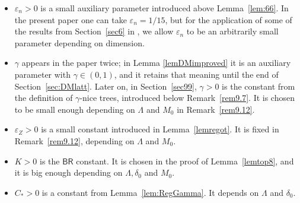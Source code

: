 \documentclass[11pt]{amsart}
\newcommand{\BR}{{\mathsf {BR}}}
\theoremstyle{definition}
\theoremstyle{remark}
\numberwithin{equation}{section}
\begin{document}
\begin{itemize}
	\item $\varepsilon_n>0$ is a small auxiliary parameter introduced above Lemma~\ref{lem:66}. In the present paper one can take $\varepsilon_n=1/15$, but for the application of some of the results from Section~\ref{sec6} in \cite{Tolsa-riesz}, we allow $\varepsilon_n$ to be an arbitrarily small parameter depending on dimension.
	\item $\gamma$ appears in the paper twice; in Lemma \ref{lemDMimproved} it is an auxiliary parameter with $\gamma\in (0,1)$, and it retains that meaning until the end of Section~\ref{sec:DMlatt}. Later on, in Section~\ref{sec99}, $\gamma>0$ is the constant from the definition of $\gamma$-nice trees, introduced below Remark~\ref{rem9.7}. It is chosen to be small enough depending on $\Lambda$ and $M_0$ in Remark~\ref{rem9.12}.
	\item $\varepsilon_Z>0$ is a small constant introduced in Lemma~\ref{lemregot}. It is fixed in Remark~\ref{rem9.12}, depending on $\Lambda$ and $M_0$.
	\item $K>0$ is the $\BR$ constant. It is chosen in the proof of Lemma~\ref{lemtop8}, and it is big enough depending on $\Lambda, \delta_0$ and $M_0$.
	\item $C_*>0$ is a constant from Lemma~\ref{lem:RegGamma}. It depends on $\Lambda$ and $\delta_0$.
\end{itemize}
\end{document}
